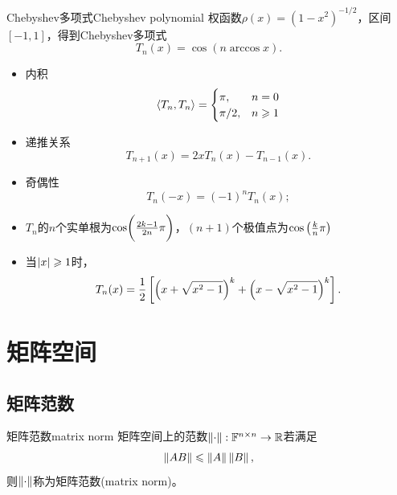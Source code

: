 \begin{example}
    {Chebyshev多项式}{Chebyshev polynomial}
    权函数$\rho(x)=(1-x^2)^{-1/2}$，区间$[-1,1]$，得到Chebyshev多项式
    \begin{equation}
        T_n(x)=\cos(n\arccos x).
    \end{equation}
    \begin{itemize}
        \item 内积 
        \begin{equation}
            \left\langle T_n,T_n\right\rangle=\begin{cases}
                \pi,&n=0\\
                \pi/2,&n\geqslant 1
            \end{cases}
        \end{equation}
        \item 递推关系
        \begin{equation}
            T_{n+1}(x)=2xT_n(x)-T_{n-1}(x).
        \end{equation}
        \item 奇偶性
        \begin{equation}
            T_n(-x)=(-1)^nT_n(x);
        \end{equation}
        \item $T_n$的$n$个实单根为$\cos\biggl(\frac{2k-1}{2n}\pi\biggr)$，$(n+1)$个极值点为$\cos\left(\frac kn\pi\right)$
        \item 当$\left\lvert x\right\rvert\geqslant 1$时，
        \begin{equation}
            T_n(x)=\frac12\left[\left(x+\sqrt{x^2-1}\right)^k+\left(x-\sqrt{x^2-1}\right)^k\right].
        \end{equation}
    \end{itemize}
\end{example}

\section{矩阵空间}
\label{sec:matrix space}

\subsection{矩阵范数}

\begin{definition}
    {矩阵范数}{matrix norm}
    矩阵空间上的范数$\left\lVert\cdot\right\rVert:\mathbb F^{n\times n}\to\mathbb R$若满足
    \begin{equation}
        \left\lVert AB\right\rVert\leqslant\left\lVert A\right\rVert\left\lVert B\right\rVert,
    \end{equation}
    则$\left\lVert\cdot\right\rVert$称为矩阵范数(matrix norm)。
\end{definition}

